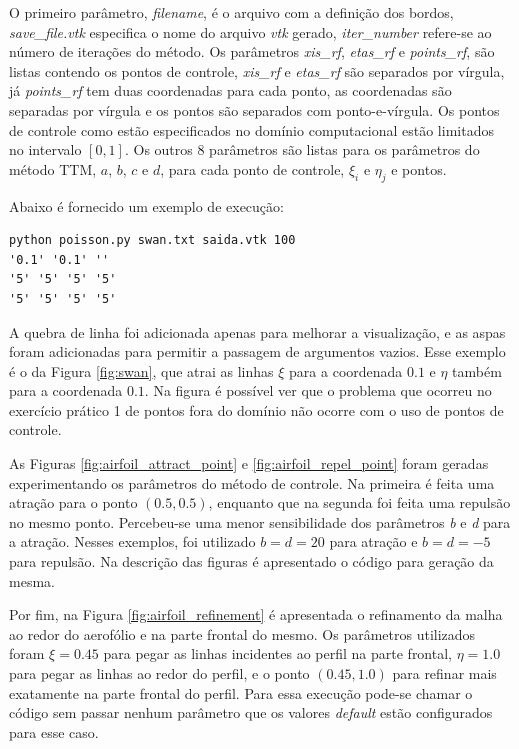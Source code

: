 \documentclass[a4paper]{article}
\begin{document}
O primeiro parâmetro, \textit{filename}, é o arquivo com a definição dos bordos, \textit{save\_file.vtk} especifica o nome do arquivo \textit{vtk} gerado, \textit{iter\_number} refere-se ao número de iterações do método. Os parâmetros \textit{xis\_rf}, \textit{etas\_rf} e \textit{points\_rf}, são listas contendo os pontos de controle, \textit{xis\_rf} e \textit{etas\_rf} são separados por vírgula, já \textit{points\_rf} tem duas coordenadas para cada ponto, as coordenadas são separadas por vírgula e os pontos são separados com ponto-e-vírgula. Os pontos de controle como estão especificados no domínio computacional estão limitados no intervalo $[0,1]$. Os outros 8 parâmetros são listas para os parâmetros do método TTM, $a$, $b$, $c$ e $d$, para cada ponto de controle, $\xi_i$ e $\eta_j$ e pontos.

Abaixo é fornecido um exemplo de execução:

\begin{verbatim}
python poisson.py swan.txt saida.vtk 100 
'0.1' '0.1' '' 
'5' '5' '5' '5' 
'5' '5' '5' '5'
\end{verbatim}

A quebra de linha foi adicionada apenas para melhorar a visualização, e as aspas foram adicionadas para permitir a passagem de argumentos vazios. Esse exemplo é o da Figura \ref{fig:swan}, que atrai as linhas $\xi$ para a coordenada $0.1$ e $\eta$ também para a coordenada $0.1$. Na figura é possível ver que o problema que ocorreu no exercício prático 1 de pontos fora do domínio não ocorre com o uso de pontos de controle.

As Figuras \ref{fig:airfoil_attract_point} e \ref{fig:airfoil_repel_point} foram geradas experimentando os parâmetros do método de controle. Na primeira é feita uma atração para o ponto $(0.5,0.5)$, enquanto que na segunda foi feita uma repulsão no mesmo ponto. Percebeu-se uma menor sensibilidade dos parâmetros \textit{b} e \textit{d} para a atração. Nesses exemplos, foi utilizado $b=d=20$ para atração e $b=d=-5$ para repulsão. Na descrição das figuras é apresentado o código para geração da mesma.

Por fim, na Figura \ref{fig:airfoil_refinement} é apresentada o refinamento da malha ao redor do aerofólio e na parte frontal do mesmo. Os parâmetros utilizados foram $\xi=0.45$ para pegar as linhas incidentes ao perfil na parte frontal, $\eta=1.0$ para pegar as linhas ao redor do perfil, e o ponto $(0.45,1.0)$ para refinar mais exatamente na parte frontal do perfil. Para essa execução pode-se chamar o código sem passar nenhum parâmetro que os valores \textit{default} estão configurados para esse caso. 
\end{document}
